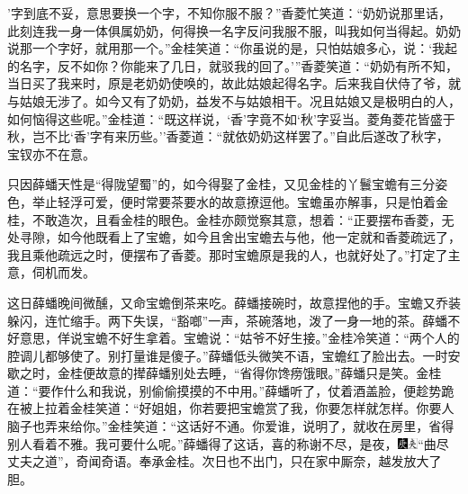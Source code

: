 '字到底不妥，意思要换一个字，不知你服不服？''香菱忙笑道：``奶奶说那里话，此刻连我一身一体俱属奶奶，何得换一名字反问我服不服，叫我如何当得起。奶奶说那一个字好，就用那一个。''金桂笑道：``你虽说的是，只怕姑娘多心，说：`我起的名字，反不如你？你能来了几日，就驳我的回了。'''香菱笑道：``奶奶有所不知，当日买了我来时，原是老奶奶使唤的，故此姑娘起得名字。后来我自伏侍了爷，就与姑娘无涉了。如今又有了奶奶，益发不与姑娘相干。况且姑娘又是极明白的人，如何恼得这些呢。''金桂道：``既这样说，`香'字竟不如`秋'字妥当。菱角菱花皆盛于秋，岂不比`香'字有来历些。''香菱道：``就依奶奶这样罢了。''自此后遂改了秋字，宝钗亦不在意。

只因薛蟠天性是``得陇望蜀''的，如今得娶了金桂，又见金桂的丫鬟宝蟾有三分姿色，举止轻浮可爱，便时常要茶要水的故意撩逗他。宝蟾虽亦解事，只是怕着金桂，不敢造次，且看金桂的眼色。金桂亦颇觉察其意，想着：``正要摆布香菱，无处寻隙，如今他既看上了宝蟾，如今且舍出宝蟾去与他，他一定就和香菱疏远了，我且乘他疏远之时，便摆布了香菱。那时宝蟾原是我的人，也就好处了。''打定了主意，伺机而发。

这日薛蟠晚间微醺，又命宝蟾倒茶来吃。薛蟠接碗时，故意捏他的手。宝蟾又乔装躲闪，连忙缩手。两下失误，``豁啷''一声，茶碗落地，泼了一身一地的茶。薛蟠不好意思，佯说宝蟾不好生拿着。宝蟾说：``姑爷不好生接。''金桂冷笑道：``两个人的腔调儿都够使了。别打量谁是傻子。''薛蟠低头微笑不语，宝蟾红了脸出去。一时安歇之时，金桂便故意的撵薛蟠别处去睡，``省得你馋痨饿眼。''薛蟠只是笑。金桂道：``要作什么和我说，别偷偷摸摸的不中用。''薛蟠听了，仗着酒盖脸，便趁势跪在被上拉着金桂笑道：``好姐姐，你若要把宝蟾赏了我，你要怎样就怎样。你要人脑子也弄来给你。''金桂笑道：``这话好不通。你爱谁，说明了，就收在房里，省得别人看着不雅。我可要什么呢。''薛蟠得了这话，喜的称谢不尽，是夜，{\includegraphics[width=3mm]{../Images/00004}\includegraphics[width=3mm]{../Images/00012}\footnotesize \kaishu ``曲尽丈夫之道''，奇闻奇语。}奉承金桂。次日也不出门，只在家中厮奈，越发放大了胆。

